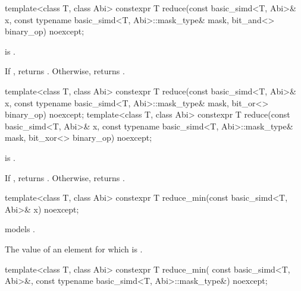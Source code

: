 \begin{itemdecl}
template<class T, class Abi>
  constexpr T reduce(const basic_simd<T, Abi>& x, const typename basic_simd<T, Abi>::mask_type& mask,
                     bit_and<> binary_op) noexcept;
\end{itemdecl}

\begin{itemdescr}
  \pnum\constraints
   is .

  \pnum\returns
  If , returns . Otherwise, returns  \forallmaskedi.
\end{itemdescr}

\begin{itemdecl}
template<class T, class Abi>
  constexpr T reduce(const basic_simd<T, Abi>& x, const typename basic_simd<T, Abi>::mask_type& mask,
                     bit_or<> binary_op) noexcept;
template<class T, class Abi>
  constexpr T reduce(const basic_simd<T, Abi>& x, const typename basic_simd<T, Abi>::mask_type& mask,
                     bit_xor<> binary_op) noexcept;
\end{itemdecl}

\begin{itemdescr}
  \pnum\constraints
   is .

  \pnum\returns
  If , returns . Otherwise, returns  \forallmaskedi.
\end{itemdescr}

\begin{itemdecl}
template<class T, class Abi> constexpr T reduce_min(const basic_simd<T, Abi>& x) noexcept;
\end{itemdecl}

\begin{itemdescr}
  \pnum\constraints
   models .

  \pnum\returns
  The value of an element  for which  is  \foralli.
\end{itemdescr}

\begin{itemdecl}
template<class T, class Abi>
  constexpr T reduce_min(
    const basic_simd<T, Abi>&, const typename basic_simd<T, Abi>::mask_type&) noexcept;
\end{itemdecl}

